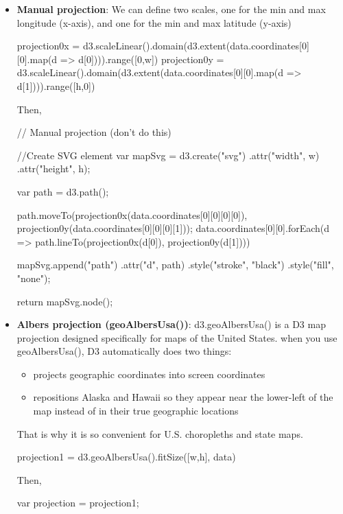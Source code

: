 \documentclass{report}
\begin{document}
\begin{itemize}
\begin{jscode}
                console.log(p.toString());
            \end{jscode}
        \item \textbf{Manual projection}: We can define two scales, one for the min and max longitude (x-axis), and one for the min and max latitude (y-axis)
            \bigbreak \noindent 
            \begin{jscode}
            projection0x = d3.scaleLinear().domain(d3.extent(data.coordinates[0][0].map(d => d[0]))).range([0,w])
            projection0y = d3.scaleLinear().domain(d3.extent(data.coordinates[0][0].map(d => d[1]))).range([h,0])
            \end{jscode}
            \bigbreak \noindent 
            Then,
            \bigbreak \noindent 
            \begin{jscode}
                // Manual projection (don't do this)
                {
                  //Create SVG element
                  var mapSvg = d3.create("svg")
                    .attr("width", w)
                      .attr("height", h);

                  var path = d3.path();

                  path.moveTo(projection0x(data.coordinates[0][0][0][0]), projection0y(data.coordinates[0][0][0][1]));
                  data.coordinates[0][0].forEach(d => path.lineTo(projection0x(d[0]), projection0y(d[1])))
                  
                  mapSvg.append("path")
                    .attr("d", path)
                    .style("stroke", "black")
                    .style("fill", "none");

                  return mapSvg.node();
                }
            \end{jscode}

        \item \textbf{Albers projection (geoAlbersUsa())}: d3.geoAlbersUsa() is a D3 map projection designed specifically for maps of the United States.
            \bigbreak \noindent 
            when you use geoAlbersUsa(), D3 automatically does two things:
            \begin{itemize}
                \item projects geographic coordinates into screen coordinates
                \item repositions Alaska and Hawaii so they appear near the lower-left of the map instead of in their true geographic locations
            \end{itemize}
            That is why it is so convenient for U.S. choropleths and state maps.
            \bigbreak \noindent 
            \begin{jscode}
            projection1 = d3.geoAlbersUsa().fitSize([w,h], data)
            \end{jscode}
            \bigbreak \noindent 
            Then, 
            \bigbreak \noindent 
            \begin{cppcode}
                {
                  var projection = projection1;
                  
}
\end{cppcode}
\end{itemize}
\end{document}
